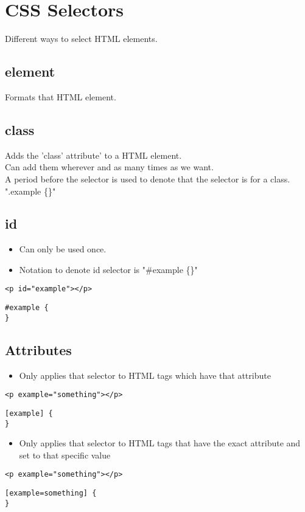 \documentclass[]{article}
\begin{document}
\section{CSS Selectors}
Different ways to select HTML elements.
\subsection{element}
Formats that HTML element.
\subsection{class}
Adds the 'class' attribute' to a HTML element.
\\
Can add them wherever and as many times as we want.
\\
A period before the selector is used to denote that the selector is for a class. ".example \{\}"

\subsection{id}
\begin{itemize}
	\item Can only be used once.
	\item Notation to denote id selector is "\#example \{\}" 
\end{itemize}
\begin{lstlisting}
<p id="example"></p>
\end{lstlisting}
\begin{lstlisting}
#example {
}
\end{lstlisting}

\subsection{Attributes}
\begin{itemize}
	\item Only applies that selector to HTML tags which have that attribute
\end{itemize}
\begin{lstlisting}
<p example="something"></p>
\end{lstlisting}
\begin{lstlisting}
[example] {
}
\end{lstlisting}
\begin{itemize}
	\item Only applies that selector to HTML tags that have the exact attribute and set to that specific value 
\end{itemize}
\begin{lstlisting}
<p example="something"></p>
\end{lstlisting}
\begin{lstlisting}
[example=something] {
}
\end{lstlisting}
\end{document}
